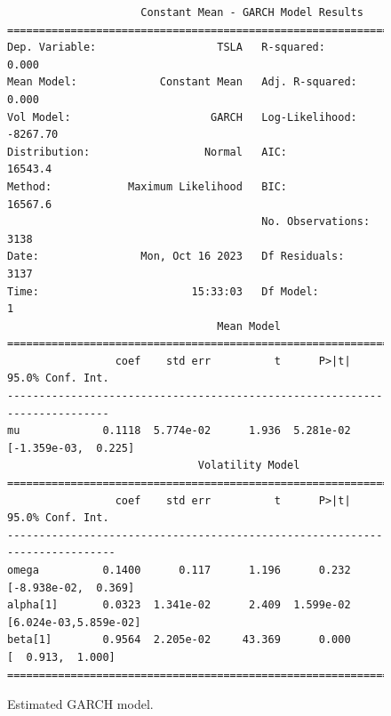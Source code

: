 \documentclass[12pt, a4paper]{article}
\begin{document}
\begin{figure}[H]
\footnotesize
\begin{verbatim}
                     Constant Mean - GARCH Model Results
==============================================================================
Dep. Variable:                   TSLA   R-squared:                       0.000
Mean Model:             Constant Mean   Adj. R-squared:                  0.000
Vol Model:                      GARCH   Log-Likelihood:               -8267.70
Distribution:                  Normal   AIC:                           16543.4
Method:            Maximum Likelihood   BIC:                           16567.6
                                        No. Observations:                 3138
Date:                Mon, Oct 16 2023   Df Residuals:                     3137
Time:                        15:33:03   Df Model:                            1
                                 Mean Model
===========================================================================
                 coef    std err          t      P>|t|     95.0% Conf. Int.
---------------------------------------------------------------------------
mu             0.1118  5.774e-02      1.936  5.281e-02 [-1.359e-03,  0.225]
                              Volatility Model
============================================================================
                 coef    std err          t      P>|t|      95.0% Conf. Int.
----------------------------------------------------------------------------
omega          0.1400      0.117      1.196      0.232  [-8.938e-02,  0.369]
alpha[1]       0.0323  1.341e-02      2.409  1.599e-02 [6.024e-03,5.859e-02]
beta[1]        0.9564  2.205e-02     43.369      0.000     [  0.913,  1.000]
============================================================================
\end{verbatim}
\caption{Estimated GARCH model.}\label{fig:garch}
\end{figure}
\end{document}
